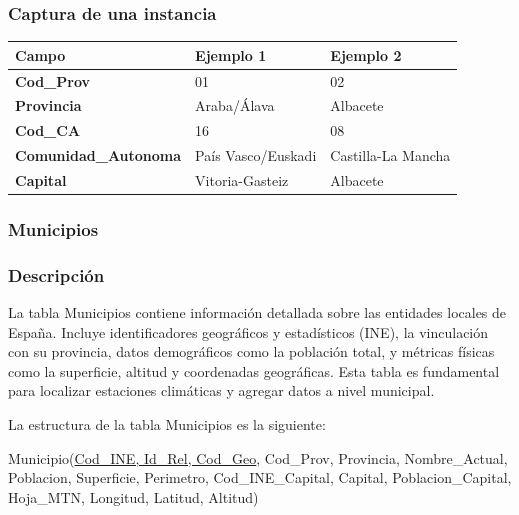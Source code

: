 \documentclass[12pt, a4paper]{article}
\begin{document}
\subsubsection*{Captura de una instancia}
\begin{center}
\begin{tabular}{|p{}|p{}|p{}|}
\hline
\textbf{Campo} & \textbf{Ejemplo 1} & \textbf{Ejemplo 2} \\
\hline
\textbf{Cod\_Prov} & 01 & 02 \\
\textbf{Provincia} & Araba/Álava & Albacete \\
\textbf{Cod\_CA} & 16 & 08 \\
\textbf{Comunidad\_Autonoma} & País Vasco/Euskadi & Castilla-La Mancha \\
\textbf{Capital} & Vitoria-Gasteiz & Albacete \\
\hline
\end{tabular}
\end{center}

\subsubsection{Municipios}
\subsubsection*{Descripción}
La tabla Municipios contiene información detallada sobre las entidades locales de España. 
Incluye identificadores geográficos y estadísticos (INE), la vinculación con su provincia, datos demográficos como la población total, y métricas físicas como la superficie, altitud y coordenadas geográficas. 
Esta tabla es fundamental para localizar estaciones climáticas y agregar datos a nivel municipal.

La estructura de la tabla Municipios es la siguiente:

Municipio(\underline{Cod\_INE, Id\_Rel, Cod\_Geo}, Cod\_Prov, Provincia, Nombre\_Actual, Poblacion, Superficie, Perimetro, Cod\_INE\_Capital, Capital, Poblacion\_Capital, Hoja\_MTN, Longitud, Latitud, Altitud)
\end{document}
